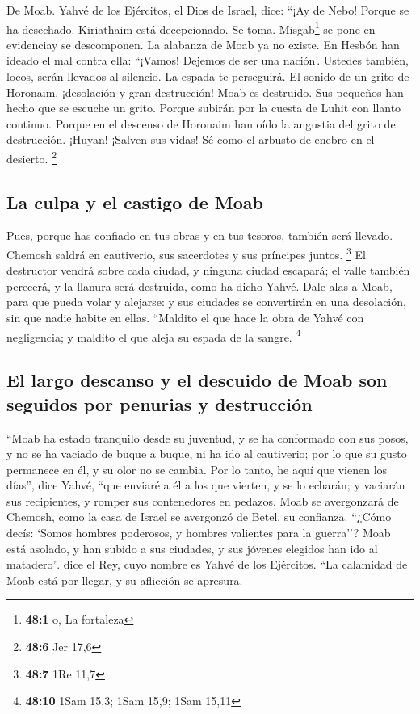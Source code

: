 \begin{paracol}{2}
 De Moab. Yahvé de los Ejércitos, el Dios de Israel, dice:
``¡Ay de Nebo! Porque se ha desechado. Kiriathaim está decepcionado. Se
toma. Misgab\footnote{\textbf{48:1} o, La fortaleza} se pone en
evidenciay se descomponen.  La alabanza de Moab ya no
existe. En Hesbón han ideado el mal contra ella: ``¡Vamos! Dejemos de
ser una nación'. Ustedes también, locos, serán llevados al silencio. La
espada te perseguirá.  El sonido de un grito de Horonaim,
¡desolación y gran destrucción!  Moab es destruido. Sus
pequeños han hecho que se escuche un grito.  Porque
subirán por la cuesta de Luhit con llanto continuo. Porque en el
descenso de Horonaim han oído la angustia del grito de destrucción.
 ¡Huyan! ¡Salven sus vidas! Sé como el arbusto de enebro
en el desierto. \footnote{\textbf{48:6} Jer 17,6}

\hypertarget{la-culpa-y-el-castigo-de-moab}{%
\subsection{La culpa y el castigo de
Moab}\label{la-culpa-y-el-castigo-de-moab}}

 Pues, porque has confiado en tus obras y en tus tesoros,
también será llevado. Chemosh saldrá en cautiverio, sus sacerdotes y sus
príncipes juntos. \footnote{\textbf{48:7} 1Re 11,7}  El
destructor vendrá sobre cada ciudad, y ninguna ciudad escapará; el valle
también perecerá, y la llanura será destruida, como ha dicho Yahvé.
 Dale alas a Moab, para que pueda volar y alejarse: y sus
ciudades se convertirán en una desolación, sin que nadie habite en
ellas.  ``Maldito el que hace la obra de Yahvé con
negligencia; y maldito el que aleja su espada de la sangre. \footnote{\textbf{48:10}
  1Sam 15,3; 1Sam 15,9; 1Sam 15,11}

\hypertarget{el-largo-descanso-y-el-descuido-de-moab-son-seguidos-por-penurias-y-destrucciuxf3n}{%
\subsection{El largo descanso y el descuido de Moab son seguidos por
penurias y
destrucción}\label{el-largo-descanso-y-el-descuido-de-moab-son-seguidos-por-penurias-y-destrucciuxf3n}}

 ``Moab ha estado tranquilo desde su juventud, y se ha
conformado con sus posos, y no se ha vaciado de buque a buque, ni ha ido
al cautiverio; por lo que su gusto permanece en él, y su olor no se
cambia.  Por lo tanto, he aquí que vienen los días'',
dice Yahvé, ``que enviaré a él a los que vierten, y se lo echarán; y
vaciarán sus recipientes, y romper sus contenedores en pedazos.
 Moab se avergonzará de Chemosh, como la casa de Israel
se avergonzó de Betel, su confianza.  ``¿Cómo decís:
`Somos hombres poderosos, y hombres valientes para la guerra''?
 Moab está asolado, y han subido a sus ciudades, y sus
jóvenes elegidos han ido al matadero''. dice el Rey, cuyo nombre es
Yahvé de los Ejércitos.  ``La calamidad de Moab está por
llegar, y su aflicción se apresura.


\end{paracol}
